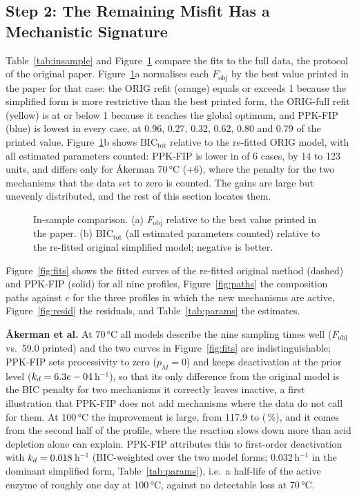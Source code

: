 \subsection{Step 2: The Remaining Misfit Has a Mechanistic Signature}
Table~\ref{tab:insample} and Figure~\ref{fig:insample} compare the fits to the full data, the protocol of the original paper. Figure~\ref{fig:insample}a normalises each $F_\mathrm{obj}$ by the best value printed in the paper for that case: the ORIG refit (orange) equals or exceeds 1 because the simplified form is more restrictive than the best printed form, the ORIG-full refit (yellow) is at or below 1 because it reaches the global optimum, and PPK-FIP (blue) is lowest in every case, at 0.96, 0.27, 0.32, 0.62, 0.80 and 0.79 of the printed value. Figure~\ref{fig:insample}b shows $\mathrm{BIC}_\mathrm{tot}$ relative to the re-fitted ORIG model, with all estimated parameters counted: PPK-FIP is lower in \InBICWins{} of 6 cases, by 14 to 123 units, and differs only for Åkerman 70\,°C (+6), where the penalty for the two mechanisms that the data set to zero is counted. The gains are large but unevenly distributed, and the rest of this section locates them.
\begin{figure}[!htbp]\centering{}\caption{In-sample comparison. (a) $F_\mathrm{obj}$ relative to the best value printed in the paper. (b) BIC$_\mathrm{tot}$ (all estimated parameters counted) relative to the re-fitted original simplified model; negative is better.}\label{fig:insample}\end{figure}

Figure~\ref{fig:fits} shows the fitted curves of the re-fitted original method (dashed) and PPK-FIP (solid) for all nine profiles, Figure~\ref{fig:paths} the composition paths against $c$ for the three profiles in which the new mechanisms are active, Figure~\ref{fig:resid} the residuals, and Table~\ref{tab:params} the estimates.

\textbf{Åkerman et al.} At 70\,°C all models describe the nine sampling times well ($F_\mathrm{obj}$ \InAkSeventyFnew{} vs.\ 59.0 printed) and the two curves in Figure~\ref{fig:fits} are indistinguishable; PPK-FIP sets processivity to zero ($p_M=0$) and keeps deactivation at the prior level ($k_d=6.3e-04$\,h$^{-1}$), so that its only difference from the original model is the BIC penalty for two mechanisms it correctly leaves inactive, a first illustration that PPK-FIP does not add mechanisms where the data do not call for them. At 100\,°C the improvement is large, from 117.9 to \InAkHundredFnew{} (\InAkHundredRed\,\%), and it comes from the second half of the profile, where the reaction slows down more than acid depletion alone can explain. PPK-FIP attributes this to first-order deactivation with $k_d=0.018$\,h$^{-1}$ (BIC-weighted over the two model forms; 0.032\,h$^{-1}$ in the dominant simplified form, Table~\ref{tab:params}), i.e.\ a half-life of the active enzyme of roughly one day at 100\,°C, against no detectable loss at 70\,°C.

